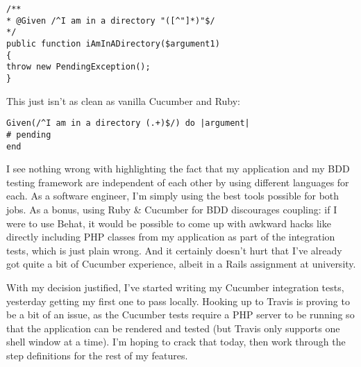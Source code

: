 \begin{lstlisting}
/**
* @Given /^I am in a directory "([^"]*)"$/
*/
public function iAmInADirectory($argument1)
{
throw new PendingException();
}
\end{lstlisting}

This just isn't as clean as vanilla Cucumber and Ruby:

\begin{lstlisting}
Given(/^I am in a directory (.+)$/) do |argument|
# pending
end
\end{lstlisting}

I see nothing wrong with highlighting the fact that my application and my BDD testing framework are independent of each other by using different languages for each. As a software engineer, I'm simply using the best tools possible for both jobs. As a bonus, using Ruby \& Cucumber for BDD discourages coupling: if I were to use Behat, it would be possible to come up with awkward hacks like directly including PHP classes from my application as part of the integration tests, which is just plain wrong. And it certainly doesn't hurt that I've already got quite a bit of Cucumber experience, albeit in a Rails assignment at university.

With my decision justified, I've started writing my Cucumber integration tests, yesterday getting my first one to pass locally. Hooking up to Travis is proving to be a bit of an issue, as the Cucumber tests require a PHP server to be running so that the application can be rendered and tested (but Travis only supports one shell window at a time). I'm hoping to crack that today, then work through the step definitions for the rest of my features.
